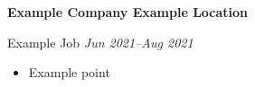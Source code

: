 \textbf{Example Company \hfill Example Location}\par

Example Job \hfill \textit{Jun 2021--Aug 2021}
\begin{itemize}
	\item Example point
\end{itemize}\par
